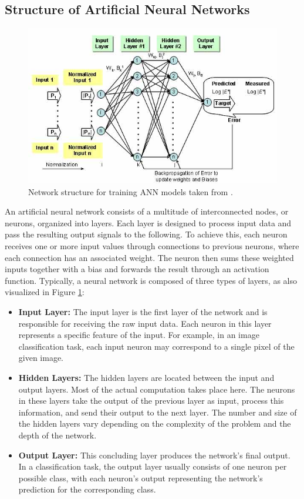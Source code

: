 \documentclass[12pt,fleqn,a4paper]{article}
\begin{document}
\subsection{Structure of Artificial Neural Networks}

\begin{figure}[H]
    \centering
    \includegraphics[width=0.56\linewidth]{graphs/annStructure.jpg}
    \caption{Network structure for training ANN models taken from \cite{FHWA}.}
    \label{fig:annStruct}
\end{figure}

An artificial neural network consists of a multitude of interconnected nodes, or neurons, organized into layers. Each layer is designed to process input data and pass the resulting output signals to the following. To achieve this, each neuron receives one or more input values through connections to previous neurons, where each connection has an associated weight. The neuron then sums these weighted inputs together with a bias and forwards the result through an activation function. Typically, a neural network is composed of three types of layers, as also visualized in Figure \ref{fig:annStruct}:

\begin{itemize}
     \item \textbf{Input Layer:} The input layer is the first layer of the network and is responsible for receiving the raw input data. Each neuron in this layer represents a specific feature of the input. For example, in an image classification task, each input neuron may correspond to a single pixel of the given image.
     \item \textbf{Hidden Layers:} The hidden layers are located between the input and output layers. Most of the actual computation takes place here. The neurons in these layers take the output of the previous layer as input, process this information, and send their output to the next layer. The number and size of the hidden layers vary depending on the complexity of the problem and the depth of the network.
     \item \textbf{Output Layer:} This concluding layer produces the network's final output. In a classification task, the output layer usually consists of one neuron per possible class, with each neuron's output representing the network's prediction for the corresponding class.
\end{itemize}
\end{document}
